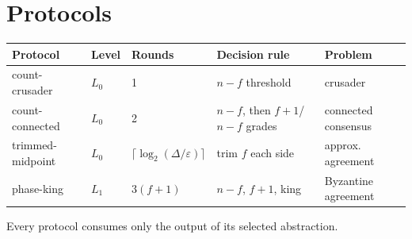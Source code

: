 \section{Protocols}\label{sec:protocols}
\begin{center}
\begin{tabular}{@{}lllll@{}}
\toprule
Protocol & Level & Rounds & Decision rule & Problem\\
\midrule
count-crusader & $L_0$ & 1 & $n-f$ threshold & crusader\\
count-connected & $L_0$ & 2 & $n-f$, then $f+1$/$n-f$ grades & connected consensus\\
trimmed-midpoint & $L_0$ & $\lceil\log_2(\Delta/\varepsilon)\rceil$ & trim $f$ each side & approx. agreement\\
phase-king & $L_1$ & $3(f+1)$ & $n-f$, $f+1$, king & Byzantine agreement\\
\bottomrule
\end{tabular}
\end{center}
Every protocol consumes only the output of its selected abstraction.
